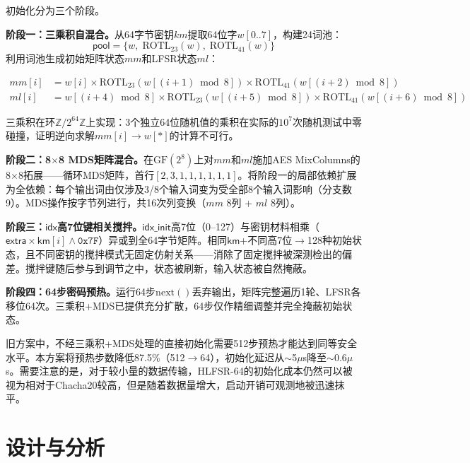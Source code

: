 \documentclass[11pt,a4paper]{ctexart}
\begin{document}
初始化分为三个阶段。

\textbf{阶段一：三乘积自混合。}从64字节密钥$km$提取64位字$w[0..7]$，构建24词池：
\[
\mathsf{pool} = \{w,\; \mathrm{ROTL}_{23}(w),\; \mathrm{ROTL}_{41}(w)\}
\]
利用词池生成初始矩阵状态$mm$和LFSR状态$ml$：

\begin{equation}
\begin{aligned}
mm[i] &= w[i] \times \mathrm{ROTL}_{23}(w[(i+1)\bmod 8]) \times \mathrm{ROTL}_{41}(w[(i+2)\bmod 8]) \\
ml[i] &= w[(i+4)\bmod 8] \times \mathrm{ROTL}_{23}(w[(i+5)\bmod 8]) \times \mathrm{ROTL}_{41}(w[(i+6)\bmod 8])
\end{aligned}
\end{equation}

三乘积在环$\mathbb{Z}/2^{64}\mathbb{Z}$上实现：3个独立64位随机值的乘积在实际的$10^7$次随机测试中零碰撞，证明逆向求解$mm[i]\to w[*]$的计算不可行。

\textbf{阶段二：8$\times$8 MDS矩阵混合。}在$\mathrm{GF}(2^8)$上对$mm$和$ml$施加AES MixColumns的8$\times$8拓展——循环MDS矩阵，首行$[2,3,1,1,1,1,1,1]$。将阶段一的局部依赖扩展为全依赖：每个输出词由仅涉及3/8个输入词变为受全部8个输入词影响（分支数9）。MDS操作按字节列进行，共16次列变换（$mm$ 8列 + $ml$ 8列）。

\textbf{阶段三：$\mathsf{idx}$高7位键相关搅拌。}$\mathsf{idx\_init}$高7位（0--127）与密钥材料相乘（$\mathsf{extra}\times\mathsf{km}[i]\land\mathtt{0x7F}$）异或到全64字节矩阵。相同$\mathsf{km}$+不同高7位$\to$128种初始状态，且不同密钥的搅拌模式无固定仿射关系——消除了固定搅拌被深测检出的偏差。搅拌键随后参与到调节之中，状态被刷新，输入状态被自然掩蔽。

\textbf{阶段四：64步密码预热。}运行64步$\mathrm{next}()$丢弃输出，矩阵完整遍历1轮、LFSR各移位64次。三乘积+MDS已提供充分扩散，64步仅作精细调整并完全掩蔽初始状态。

旧方案中，不经三乘积+MDS处理的直接初始化需要512步预热才能达到同等安全水平。本方案将预热步数降低87.5\%（512$\to$64），初始化延迟从$\sim$5$\mu$s降至$\sim$0.6$\mu$s。需要注意的是，对于较小量的数据传输，HLFSR-64的初始化成本仍然可以被视为相对于Chacha20较高，但是随着数据量增大，启动开销可观测地被迅速抹平。

\clearpage
\section{设计与分析}
\end{document}

